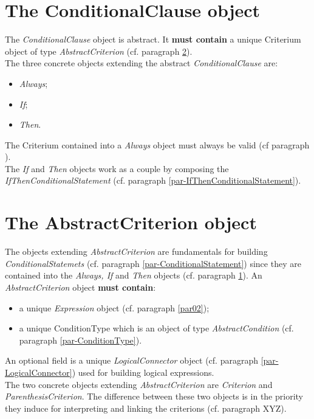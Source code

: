 \documentclass[a4paper,11pt] {article}
\begin{document}
\section{The ConditionalClause object}\label{par-ConditionalClause}
The {\it ConditionalClause} object is abstract. It {\bf must contain} a unique Criterium object of type {\it AbstractCriterion} (cf. paragraph \ref{par-AbstractCriterion}).\\
The three concrete objects extending the abstract {\it ConditionalClause} are:
\begin{itemize}
\item {\it Always};
\item {\it If};
\item {\it Then}.
\end{itemize}
The Criterium contained into a {\it Always} object must always be valid (cf paragraph \label{par-AlwaysConditionalStatement}).\\
The {\it If} and {\it Then} objects work as a couple by composing the  {\it IfThenConditionalStatement} (cf. paragraph 
\ref{par-IfThenConditionalStatement}).

\section{The AbstractCriterion object}\label{par-AbstractCriterion}
The objects extending {\it AbstractCriterion} are fundamentals for building {\it ConditionalStatemets} (cf. paragraph \ref{par-ConditionalStatement}) since they are contained into the {\it Always, If} and {\it Then} objects (cf. paragraph \ref{par-ConditionalClause}).
An {\it AbstractCriterion} object {\bf must contain}:
\begin{itemize}
\item a unique {\it Expression} object (cf. paragraph \ref{par02});
\item a unique ConditionType which is an object of type {\it AbstractCondition} (cf. paragraph  \ref{par-ConditionType}).
\end{itemize}
An optional field is a unique {\it LogicalConnector} object (cf. paragraph \ref{par-LogicalConnector}) used for building logical expressions.\\

The two concrete objects extending  {\it AbstractCriterion}  are {\it Criterion} and {\it ParenthesisCriterion}. The difference between these two objects is in the priority they induce for interpreting and linking the criterions (cf. paragraph XYZ).
\end{document}
